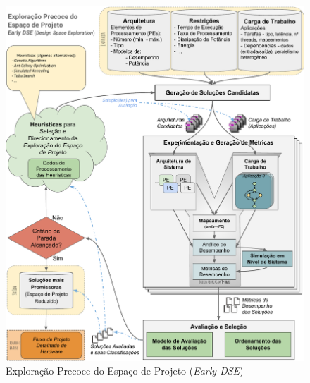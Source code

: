 \documentclass[tese-proposta,nocipinfo]{texufpel}
\begin{document}
\begin{figure}[tbp]
\centering
\includegraphics[scale=0.65]{Imagens/Figura_Conceitual_-_Tese}
	\caption{\label{fig:FiguraConceitual} Exploração Precoce do Espaço de Projeto (\textit{Early DSE})}
\end{figure}


\end{document}

